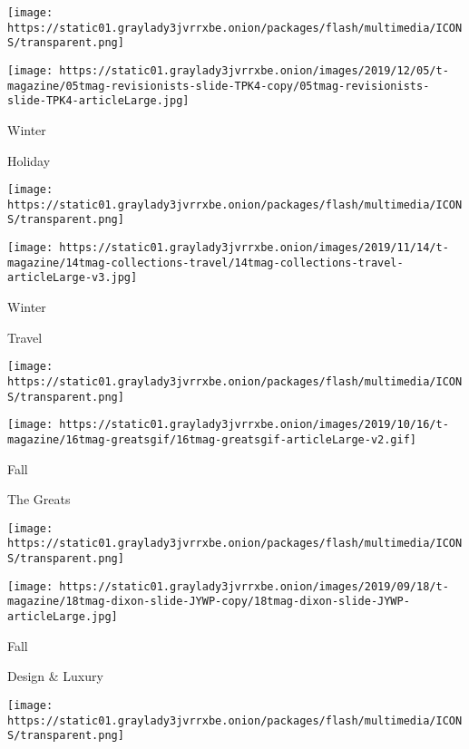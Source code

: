 \href{https://www.nytimes3xbfgragh.onion/issue/t-magazine/2019/11/21/ts-dec-8-holiday-issue}{}

\texttt{[image: https://static01.graylady3jvrrxbe.onion/packages/flash/multimedia/ICONS/transparent.png]}

\texttt{[image: https://static01.graylady3jvrrxbe.onion/images/2019/12/05/t-magazine/05tmag-revisionists-slide-TPK4-copy/05tmag-revisionists-slide-TPK4-articleLarge.jpg]}

Winter

Holiday

\href{https://www.nytimes3xbfgragh.onion/issue/t-magazine/2019/11/04/ts-nov-17-travel-issue}{}

\texttt{[image: https://static01.graylady3jvrrxbe.onion/packages/flash/multimedia/ICONS/transparent.png]}

\texttt{[image: https://static01.graylady3jvrrxbe.onion/images/2019/11/14/t-magazine/14tmag-collections-travel/14tmag-collections-travel-articleLarge-v3.jpg]}

Winter

Travel

\href{https://www.nytimes3xbfgragh.onion/issue/t-magazine/2019/10/04/ts-oct-20-greats-issue}{}

\texttt{[image: https://static01.graylady3jvrrxbe.onion/packages/flash/multimedia/ICONS/transparent.png]}

\texttt{[image: https://static01.graylady3jvrrxbe.onion/images/2019/10/16/t-magazine/16tmag-greatsgif/16tmag-greatsgif-articleLarge-v2.gif]}

Fall

The Greats

\href{https://www.nytimes3xbfgragh.onion/issue/t-magazine/2019/09/09/ts-sept-22-design-luxury-issue}{}

\texttt{[image: https://static01.graylady3jvrrxbe.onion/packages/flash/multimedia/ICONS/transparent.png]}

\texttt{[image: https://static01.graylady3jvrrxbe.onion/images/2019/09/18/t-magazine/18tmag-dixon-slide-JYWP-copy/18tmag-dixon-slide-JYWP-articleLarge.jpg]}

Fall

Design \& Luxury

\href{https://www.nytimes3xbfgragh.onion/issue/t-magazine/2019/08/27/ts-sept-8-mens-fashion-issue}{}

\texttt{[image: https://static01.graylady3jvrrxbe.onion/packages/flash/multimedia/ICONS/transparent.png]}

